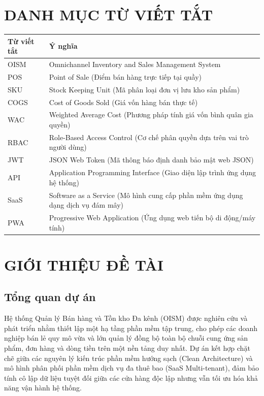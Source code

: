 \documentclass[12pt,a4paper]{report}
\begin{document}
	\chapter*{DANH MỤC TỪ VIẾT TẮT}
	\begin{longtable}{p{}p{}}
		\toprule
		\textbf{Từ viết tắt} & \textbf{Ý nghĩa}\\
		\midrule
		OISM & Omnichannel Inventory and Sales Management System\\
		POS & Point of Sale (Điểm bán hàng trực tiếp tại quầy)\\
		SKU & Stock Keeping Unit (Mã phân loại đơn vị lưu kho sản phẩm)\\
		COGS & Cost of Goods Sold (Giá vốn hàng bán thực tế)\\
		WAC & Weighted Average Cost (Phương pháp tính giá vốn bình quân gia quyền)\\
		RBAC & Role-Based Access Control (Cơ chế phân quyền dựa trên vai trò người dùng)\\
		JWT & JSON Web Token (Mã thông báo định danh bảo mật web JSON)\\
		API & Application Programming Interface (Giao diện lập trình ứng dụng hệ thống)\\
		SaaS & Software as a Service (Mô hình cung cấp phần mềm ứng dụng dạng dịch vụ đám mây)\\
		PWA & Progressive Web Application (Ứng dụng web tiến bộ di động/máy tính)\\
		\bottomrule
	\end{longtable}
	
	\tableofcontents
	\listoffigures
	\listoftables
	
	\chapter{GIỚI THIỆU ĐỀ TÀI}
	\section{Tổng quan dự án}
	Hệ thống Quản lý Bán hàng và Tồn kho Đa kênh (OISM) được nghiên cứu và phát triển nhằm thiết lập một hạ tầng phần mềm tập trung, cho phép các doanh nghiệp bán lẻ quy mô vừa và lớn quản lý đồng bộ toàn bộ chuỗi cung ứng sản phẩm, đơn hàng và dòng tiền trên một nền tảng duy nhất. Dự án kết hợp chặt chẽ giữa các nguyên lý kiến trúc phần mềm hướng sạch (Clean Architecture) và mô hình phân phối phần mềm dịch vụ đa thuê bao (SaaS Multi-tenant), đảm bảo tính cô lập dữ liệu tuyệt đối giữa các cửa hàng độc lập nhưng vẫn tối ưu hóa khả năng vận hành hệ thống.
	
\end{document}
